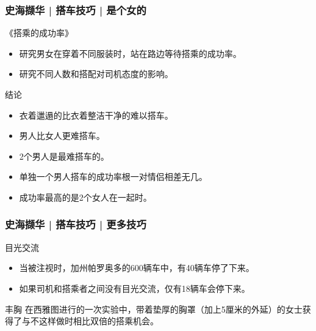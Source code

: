 \begin{frame}
  \frametitle{史海撷华 | 搭车技巧 | 是个女的}
  \begin{block}{《搭乘的成功率》}
    \begin{itemize}
      \item 研究男女在穿着不同服装时，站在路边等待搭乘的成功率。
      \item 研究不同人数和搭配对司机态度的影响。
    \end{itemize}
  \end{block}
  \pause
  \begin{block}{结论}
    \begin{itemize}
      \item 衣着邋遢的比衣着整洁干净的难以搭车。
      \item 男人比女人更难搭车。
      \item 2个男人是最难搭车的。
      \item 单独一个男人搭车的成功率根一对情侣相差无几。
      \item 成功率最高的是2个女人在一起时。
    \end{itemize}
  \end{block}
\end{frame}

\begin{frame}
  \frametitle{史海撷华 | 搭车技巧 | 更多技巧}
  \begin{block}{目光交流}
    \begin{itemize}
      \item 当被注视时，加州帕罗奥多的600辆车中，有40辆车停了下来。
      \item 如果司机和搭乘者之间没有目光交流，仅有18辆车会停下来。
    \end{itemize}
  \end{block}
  \pause
  \begin{block}{丰胸}
在西雅图进行的一次实验中，带着垫厚的胸罩（加上5厘米的外延）的女士获得了与不这样做时相比双倍的搭乘机会。 
  \end{block}
\end{frame}

